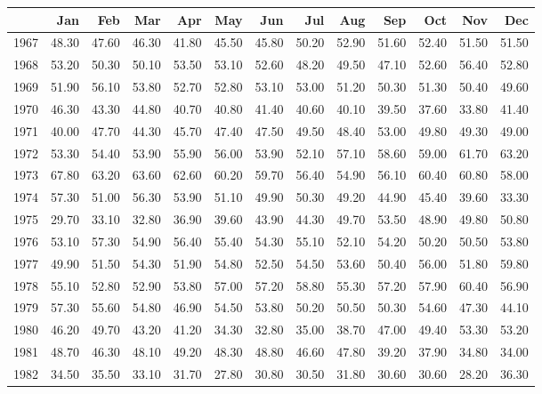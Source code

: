\begin{longtable}{rrrrrrrrrrrrr}
  \hline
 & Jan & Feb & Mar & Apr & May & Jun & Jul & Aug & Sep & Oct & Nov & Dec \\ 
  \hline
1967 & 48.30 & 47.60 & 46.30 & 41.80 & 45.50 & 45.80 & 50.20 & 52.90 & 51.60 & 52.40 & 51.50 & 51.50 \\ 
  1968 & 53.20 & 50.30 & 50.10 & 53.50 & 53.10 & 52.60 & 48.20 & 49.50 & 47.10 & 52.60 & 56.40 & 52.80 \\ 
  1969 & 51.90 & 56.10 & 53.80 & 52.70 & 52.80 & 53.10 & 53.00 & 51.20 & 50.30 & 51.30 & 50.40 & 49.60 \\ 
  1970 & 46.30 & 43.30 & 44.80 & 40.70 & 40.80 & 41.40 & 40.60 & 40.10 & 39.50 & 37.60 & 33.80 & 41.40 \\ 
  1971 & 40.00 & 47.70 & 44.30 & 45.70 & 47.40 & 47.50 & 49.50 & 48.40 & 53.00 & 49.80 & 49.30 & 49.00 \\ 
  1972 & 53.30 & 54.40 & 53.90 & 55.90 & 56.00 & 53.90 & 52.10 & 57.10 & 58.60 & 59.00 & 61.70 & 63.20 \\ 
  1973 & 67.80 & 63.20 & 63.60 & 62.60 & 60.20 & 59.70 & 56.40 & 54.90 & 56.10 & 60.40 & 60.80 & 58.00 \\ 
  1974 & 57.30 & 51.00 & 56.30 & 53.90 & 51.10 & 49.90 & 50.30 & 49.20 & 44.90 & 45.40 & 39.60 & 33.30 \\ 
  1975 & 29.70 & 33.10 & 32.80 & 36.90 & 39.60 & 43.90 & 44.30 & 49.70 & 53.50 & 48.90 & 49.80 & 50.80 \\ 
  1976 & 53.10 & 57.30 & 54.90 & 56.40 & 55.40 & 54.30 & 55.10 & 52.10 & 54.20 & 50.20 & 50.50 & 53.80 \\ 
  1977 & 49.90 & 51.50 & 54.30 & 51.90 & 54.80 & 52.50 & 54.50 & 53.60 & 50.40 & 56.00 & 51.80 & 59.80 \\ 
  1978 & 55.10 & 52.80 & 52.90 & 53.80 & 57.00 & 57.20 & 58.80 & 55.30 & 57.20 & 57.90 & 60.40 & 56.90 \\ 
  1979 & 57.30 & 55.60 & 54.80 & 46.90 & 54.50 & 53.80 & 50.20 & 50.50 & 50.30 & 54.60 & 47.30 & 44.10 \\ 
  1980 & 46.20 & 49.70 & 43.20 & 41.20 & 34.30 & 32.80 & 35.00 & 38.70 & 47.00 & 49.40 & 53.30 & 53.20 \\ 
  1981 & 48.70 & 46.30 & 48.10 & 49.20 & 48.30 & 48.80 & 46.60 & 47.80 & 39.20 & 37.90 & 34.80 & 34.00 \\ 
  1982 & 34.50 & 35.50 & 33.10 & 31.70 & 27.80 & 30.80 & 30.50 & 31.80 & 30.60 & 30.60 & 28.20 & 36.30 \\ 

\end{longtable}
